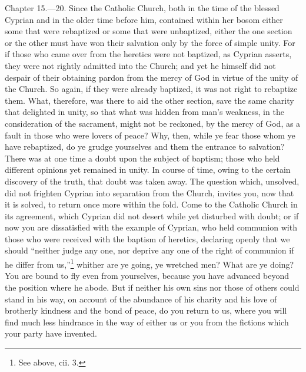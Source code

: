 Chapter 15.—20. Since the Catholic Church, both in the time of the blessed Cyprian and in the older time before him, contained within her bosom either some that were rebaptized or some that were unbaptized, either the one section or the other must have won their salvation only by the force of simple unity. For if those who came over from the heretics were not baptized, as Cyprian asserts, they were not rightly admitted into the Church; and yet he himself did not despair of their obtaining pardon from the mercy of God in virtue of the unity of the Church. So again, if they were already baptized, it was not right to rebaptize them. What, therefore, was there to aid the other section, save the same charity that delighted in unity, so that what was hidden from man’s weakness, in the consideration of the sacrament, might not be reckoned, by the mercy of God, as a fault in those who were lovers of peace? Why, then, while ye fear those whom ye have rebaptized, do ye grudge yourselves and them the entrance to salvation? There was at one time a doubt upon the subject of baptism; those who held different opinions yet remained in unity. In course of time, owing to the certain discovery of the truth, that doubt was taken away. The question which, unsolved, did not frighten Cyprian into separation from the Church, invites you, now that it is solved, to return once more within the fold. Come to the Catholic Church in its agreement, which Cyprian did not desert while yet disturbed with doubt; or if now you are dissatisfied with the example of Cyprian, who held communion with those who were received with the baptism of heretics, declaring openly that we should ``neither judge any one, nor deprive any one of the right of communion if he differ from us,''\footnote{\par  See above, cii. 3.} whither are ye going, ye wretched men? What are ye doing? You are bound to fly even from yourselves, because you have advanced beyond the position where he abode. But if neither his own sins nor those of others could stand in his way, on account of the abundance of his charity and his love of brotherly kindness and the bond of peace, do you return to us, where you will find much less hindrance in the way of either us or you from the fictions which your party have invented.


